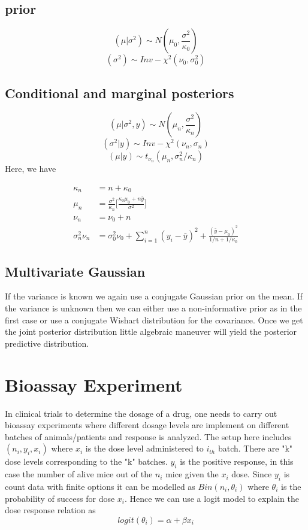 \documentclass[twoside]{article}
\begin{document}
\subsection*{prior}
\[(\mu|\sigma^2) \sim N(\mu_0, \frac{\sigma^2}{\kappa_0})  \]
\[(\sigma^2) \sim Inv-\chi^2(\nu_0, \sigma^2_0)\]

\subsection*{Conditional and marginal posteriors}
\[(\mu|\sigma^2,y) \sim N(\mu_n,\frac{\sigma^2}{\kappa_n})\]
\[(\sigma^2|y) \sim Inv-\chi^2(\nu_n,\sigma_n)\]
\[(\mu|y) \sim t_{\nu_n}(\mu_n, \sigma^2_n/\kappa_n)\]
Here, we have 

\begin{align}
\kappa_n &= n +\kappa_0\\
\mu_n &= \frac{\sigma^2}{\kappa_n}\Big[\frac{\kappa_0\mu_0 + n\bar{y}}{\sigma^2}\Big]\\
\nu_n &= \nu_0 + n\\
\sigma_n^2\nu_n &= \sigma_0^2\nu_0 + \sum_{i=1}^{n}(y_i - \bar{y})^2
 + \frac{(\bar{y} - \mu_0)^2}{1/n + 1/\kappa_0} \end{align}

  
\subsection*{Multivariate Gaussian}
If the variance is known we again use a conjugate Gaussian prior on the mean. If the variance is unknown then we can either use a non-informative prior as in the first case or use a conjugate Wishart distribution for the covariance. Once we get the joint posterior distribution little algebraic maneuver will yield the posterior predictive distribution. 

\section{Bioassay Experiment}
In clinical trials to determine the dosage of a drug, one needs to carry out bioassay experiments where different dosage levels are implement on different batches of animals/patients and  response is analyzed. 
The setup here includes $(n_i,y_i,x_i)$ where $x_i$ is the dose level administered to $i_{th}$ batch. There are "k" dose levels corresponding to the "k" batches. $y_i$ is the positive response, in this case the number of alive mice out of the $n_i$ mice given the $x_i$ dose. 
Since $y_i$ is count data with finite options it can be modelled as $Bin(n_i,\theta_i)$ where $\theta_i$ is the probability of success for dose $x_i$. Hence we can use a logit model to explain the dose response relation as
\[logit(\theta_i) = \alpha + \beta x_i\]
\end{document}
